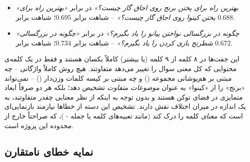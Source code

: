 \documentclass[11pt,a4paper]{article}
\begin{document}
	\begin{itemize}
		\item \emph{«بهترین راه برای پختن برنج روی اجاق گاز چیست؟»} در برابر \emph{«بهترین راه برای پختن کینوا روی اجاق گاز چیست؟»} -- شباهت  برابر $0.695$؛ شباهت  برابر $0.688$.
		\item \emph{«چگونه در بزرگسالی نواختن پیانو را یاد بگیرم؟»} در برابر \emph{«چگونه در بزرگسالی شطرنج بازی کردن را یاد بگیرم؟»} -- شباهت  برابر $0.734$؛ شباهت  برابر $0.672$.
	\end{itemize}
	
	این جفت‌ها در ۸ کلمه از ۹ کلمه (یا بیشتر) کاملاً یکسان هستند و فقط در یک کلمه‌ی محتوایی که کل معنی سوال را تغییر می‌دهد متفاوتند. هیچ روش کاملاً واژگانی -- چه مبتنی بر هم‌پوشانی مجموعه () و چه مبتنی بر کیسه کلمات وزن‌دار () -- نمی‌تواند «برنج» را از «کینوا» به عنوان \emph{موضوعات متفاوت} تشخیص دهد؛ بلکه هر دو صرفاً ابعاد متمایزی در فضای توکن هستند و بدون توجه به اینکه از نظر معنایی چقدر متفاوتند، به یک اندازه در میزان اختلاف نقش دارند. تشخیص این دسته از خطاها نیازمند بازنمایی‌ای است که \emph{معنای} کلمه را درک کند (مانند تعبیه‌های کلمه یا جمله - )، که صراحتاً خارج از محدوده این پروژه است.
	
	\subsection{نمایه خطای نامتقارن }
	
\end{document}

